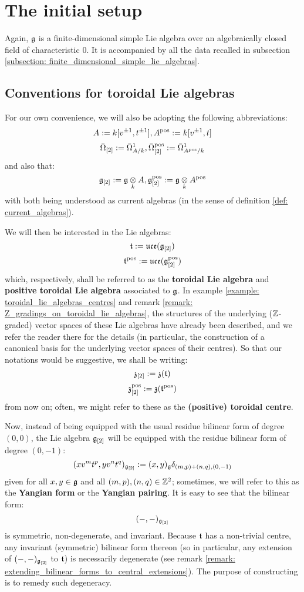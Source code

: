 \section{The initial setup}
    Again, $\mathfrak{g}$ is a finite-dimensional simple Lie algebra over an algebraically closed field of characteristic $0$. It is accompanied by all the data recalled in subsection \ref{subsection: finite_dimensional_simple_lie_algebras}. 

    \subsection{Conventions for toroidal Lie algebras} \label{subsection: toroidal_lie_algebra_conventions}
        For our own convenience, we will also be adopting the following abbreviations:
            $$A := k[v^{\pm 1}, t^{\pm 1}], A^{\mathrm{pos}} := k[v^{\pm 1}, t]$$
            $$\bar{\Omega}_{[2]} := \bar{\Omega}^1_{A/k}, \bar{\Omega}_{[2]}^{\mathrm{pos}} := \bar{\Omega}^1_{A^{\mathrm{pos}}/k}$$
        and also that:
            $$\g_{[2]} := \g \tensor_k A, \g_{[2]}^{\positive} := \g \tensor_k A^{\positive}$$
        with both being understood as current algebras (in the sense of definition \ref{def: current_algebras}).
    
        We will then be interested in the Lie algebras:
            $$\mathfrak{t} := \mathfrak{uce}(\mathfrak{g}_{[2]})$$
            $$\mathfrak{t}^{\mathrm{pos}} := \mathfrak{uce}(\mathfrak{g}_{[2]}^{\mathrm{pos}})$$
        which, respectively, shall be referred to as the \textbf{toroidal Lie algebra} and \textbf{positive toroidal Lie algebra} associated to $\mathfrak{g}$. In example \ref{example: toroidal_lie_algebras_centres} and remark \ref{remark: Z_gradings_on_toroidal_lie_algebras}, the structures of the underlying ($\mathbb{Z}$-graded) vector spaces of these Lie algebras have already been described, and we refer the reader there for the details (in particular, the construction of a canonical basis for the underlying vector spaces of their centres). So that our notations would be suggestive, we shall be writing:
            $$\mathfrak{z}_{[2]} := \mathfrak{z}(\mathfrak{t})$$
            $$\mathfrak{z}_{[2]}^{\mathrm{pos}} := \mathfrak{z}(\mathfrak{t}^{\mathrm{pos}})$$
        from now on; often, we might refer to these as the \textbf{(positive) toroidal centre}.
        
        Now, instead of being equipped with the usual residue bilinear form of degree $(0, 0)$, the Lie algebra $\mathfrak{g}_{[2]}$ will be equipped with the residue bilinear form of degree $(0, -1)$:
            $$(x v^m t^p, y v^n t^q)_{\mathfrak{g}_{[2]}} := (x, y)_{\mathfrak{g}} \delta_{(m, p) + (n, q), (0, -1)}$$
        given for all $x, y \in \mathfrak{g}$ and all $(m, p), (n, q) \in \mathbb{Z}^2$; sometimes, we will refer to this as the \textbf{Yangian form} or the \textbf{Yangian pairing}. It is easy to see that the bilinear form:
            $$(-, -)_{\mathfrak{g}_{[2]}}$$
        is symmetric, non-degenerate, and invariant. Because $\mathfrak{t}$ has a non-trivial centre, any invariant (symmetric) bilinear form thereon (so in particular, any extension of $(-, -)_{\mathfrak{g}_{[2]}}$ to $\mathfrak{t}$) is necessarily degenerate (see remark \ref{remark: extending_bilinear_forms_to_central_extensions}). The purpose of constructing  is to remedy such degeneracy.

